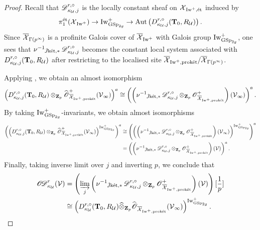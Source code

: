\begin{proof}
Recall that $\scrD_{\kappa_{\calU}, j}^{r, \circ}$ is the locally constant sheaf on $\calX_{\Iw^+, \et}$ induced by $$\pi_1^{\et}(\calX_{\Iw^+})\rightarrow \Iw^+_{\GSp_{2g}}\rightarrow \Aut\left(D_{\kappa_{\calU}, j}^{r, \circ}(\T_0, R_{\calU})\right).$$ 
Since $\overline{\calX}_{\Gamma(p^{\infty})}$ is a profinite Galois cover of $\overline{\calX}_{\Iw^+}$ with Galois group $\Iw^+_{\GSp_{2g}}$, one sees that $\nu^{-1}\jmath_{\ket, *}\scrD_{\kappa_{\calU}, j}^{r, \circ}$ becomes the constant local system associated with $D_{\kappa_{\calU}, j}^{r, \circ}(\T_0, R_{\calU})$ after restricting to the localised site $\overline{\calX}_{\Iw^+, \proket}/\overline{\calX}_{\Gamma(p^{\infty})}$. 

Applying \cite[Theorem 5.4.3]{Diao}, we obtain an almost isomorphism $$\left(D_{\kappa_{\calU}, j}^{r, \circ}(\T_0, R_{\calU})\otimes_{\Z_p}\widehat{\scrO}_{\overline{\calX}_{\Iw^+, \proket}}^{+}(\calV_{\infty})\right)^a\cong \left(\left(\nu^{-1}\jmath_{\ket,*}\scrD_{\kappa_{\calU}, j}^{r, \circ}\otimes_{\Z_p}\scrO_{\overline{\calX}_{\Iw^+, \proket}}^+\right)(\calV_{\infty})\right)^a.$$ By taking $\Iw^+_{\GSp_{2g}}$-invariants, we obtain almost isomorphisms \begin{align*}
    \left(\left(D_{\kappa_{\calU}, j}^{r, \circ}(\T_0, R_{\calU})\otimes_{\Z_p}\widehat{\scrO}_{\overline{\calX}_{\Iw^+, \proket}}^{+}(\calV_{\infty})\right)^{\Iw^+_{\GSp_{2g}}}\right)^a & \cong \left(\left(\left(\nu^{-1}\jmath_{\ket,*}\scrD_{\kappa_{\calU}, j}^{r, \circ}\otimes_{\Z_p}\scrO_{\overline{\calX}_{\Iw^+, \proket}}^+\right)(\calV_{\infty})\right)^{\Iw^+_{\GSp_{2g}}}\right)^a\\
    & = \left(\left(\nu^{-1}\jmath_{\ket,*}\scrD_{\kappa_{\calU}, j}^{r, \circ}\otimes_{\Z_p}\scrO_{\overline{\calX}_{\Iw^+, \proket}}^+\right)(\calV)\right)^{a}.
\end{align*} Finally, taking inverse limit over $j$ and inverting $p$, we conclude that \begin{align*}
    \sheafOD_{\kappa_{\calU}}^r(\calV) & = \left(\varinjlim_{j}\left(\nu^{-1}\jmath_{\ket, *}\scrD_{\kappa_{\calU}, j}^{r, \circ}\otimes_{\Z_p}\scrO_{\overline{\calX}_{\Iw^+, \proket}}^+\right)(\calV)\right)[\frac{1}{p}]\\
    & \cong \left(D_{\kappa_{\calU}}^{r, \circ}(\T_0, R_{\calU})\widehat{\otimes}_{\Z_p}\widehat{\scrO}_{\overline{\calX}_{\Iw^+, \proket}}(\calV_{\infty})\right)^{\Iw^+_{\GSp_{2g}}}.
\end{align*}
\end{proof}

